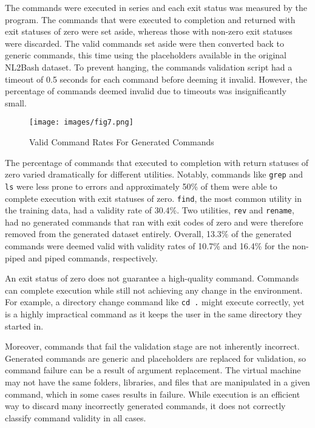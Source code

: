 \documentclass{river-journal}
\begin{document}
The commands were executed in series and each exit status was measured by the program. The commands that were executed to completion and returned with exit statuses of zero were set aside, whereas those with non-zero exit statuses were discarded. The valid commands set aside were then converted back to generic commands, this time using the placeholders available in the original NL2Bash dataset. To prevent hanging, the commands validation script had a timeout of 0.5 seconds for each command before deeming it invalid. However, the percentage of commands deemed invalid due to timeouts was insignificantly small.

\begin{figure}[hbpt]
\centering
\texttt{[image: images/fig7.png]}
\caption{Valid Command Rates For Generated Commands}
\label{fig:err}
\end{figure}

The percentage of commands that executed to completion with return statuses of zero varied dramatically for different utilities. Notably, commands like \texttt{grep} and \texttt{ls} were less prone to errors and approximately 50\% of them were able to complete execution with exit statuses of zero. \texttt{find}, the most common utility in the training data, had a validity rate of 30.4\%. Two utilities, \texttt{rev} and \texttt{rename}, had no generated commands that ran with exit codes of zero and were therefore removed from the generated dataset entirely. Overall, 13.3\% of the generated commands were deemed valid with validity rates of 10.7\% and 16.4\% for the non-piped and piped commands, respectively.

An exit status of zero does not guarantee a high-quality command. Commands can complete execution while still not achieving any change in the environment. For example, a directory change command like \texttt{cd .} might execute correctly, yet is a highly impractical command as it keeps the user in the same directory they started in.

Moreover, commands that fail the validation stage are not inherently incorrect. Generated commands are generic and placeholders are replaced for validation, so command failure can be a result of argument replacement. The virtual machine may not have the same folders, libraries, and files that are manipulated in a given command, which in some cases results in failure. While execution is an efficient way to discard many incorrectly generated commands, it does not correctly classify command validity in all cases.
\end{document}
